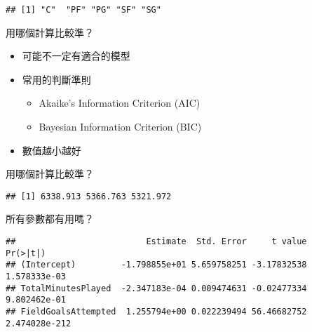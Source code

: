 \documentclass[]{book}
\newenvironment{Shaded}{\begin{snugshade}}{\end{snugshade}}
\newcommand{\KeywordTok}[1]{\textcolor[rgb]{0.13,0.29,0.53}{\textbf{{#1}}}}
\newcommand{\DataTypeTok}[1]{\textcolor[rgb]{0.13,0.29,0.53}{{#1}}}
\newcommand{\NormalTok}[1]{{#1}}
\providecommand{\tightlist}{%
  \setlength{\itemsep}{0pt}\setlength{\parskip}{0pt}}
\begin{document}
\begin{verbatim}
## [1] "C"  "PF" "PG" "SF" "SG"
\end{verbatim}

用哪個計算比較準？

\begin{itemize}
\tightlist
\item
  可能不一定有適合的模型
\item
  常用的判斷準則

  \begin{itemize}
  \tightlist
  \item
    Akaike's Information Criterion (AIC)
  \item
    Bayesian Information Criterion (BIC)
  \end{itemize}
\item
  數值越小越好
\end{itemize}

用哪個計算比較準？

\begin{Shaded}
\end{Shaded}

\begin{verbatim}
## [1] 6338.913 5366.763 5321.972
\end{verbatim}

所有參數都有用嗎？

\begin{Shaded}
\end{Shaded}

\begin{verbatim}
##                          Estimate  Std. Error     t value      Pr(>|t|)
## (Intercept)         -1.798855e+01 5.659758251 -3.17832538  1.578333e-03
## TotalMinutesPlayed  -2.347183e-04 0.009474631 -0.02477334  9.802462e-01
## FieldGoalsAttempted  1.255794e+00 0.022239494 56.46682752 2.474028e-212
\end{verbatim}
\end{document}
